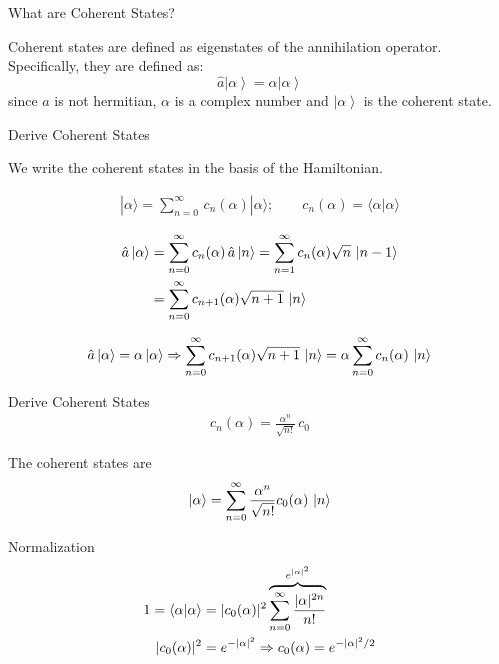 \documentclass{loyola-beamer}
\begin{document}
\begin{frame}{What are Coherent States?}

    Coherent states are defined as eigenstates of the annihilation operator. Specifically, they are defined as:
    \begin{equation}
        \hat{a} \left| \alpha \right\rangle = \alpha \left| \alpha \right\rangle
    \end{equation}
    since $\hat{a}$ is not hermitian, $\alpha$ is a complex number and $\left|\alpha\right\rangle$ is the coherent state.

\end{frame}

\begin{frame}{Derive Coherent States}

    We write the coherent states in the basis of the Hamiltonian.

    \begin{align*}
        | \alpha \rangle  = \sum_{n=0}^{\infty} \, c_n(\alpha) |\alpha \rangle;
        \qquad c_n(\alpha) = \langle \alpha | \alpha \rangle
    \end{align*}

    \begin{align*}
        \hat{a} \ket{\alpha} & = \sum_{n=0}^\infty c_n(\alpha)\, \hat{a} \ket{n}
        = \sum_{n=1}^\infty c_n(\alpha)\sqrt{n}\, \ket{n-1}                            \\
                             & = \sum_{n=0}^\infty c_{n+1}(\alpha)\sqrt{n+1}\, \ket{n}
    \end{align*}

    \begin{align*}
        \hat{a} \ket{\alpha} = \alpha \ket{\alpha} \Rightarrow
        \sum_{n=0}^\infty c_{n+1}(\alpha)\sqrt{n+1}\, \ket{n}
        = \alpha \sum_{n=0}^\infty c_{n}(\alpha)\, \ket{n}
    \end{align*}

\end{frame}

\begin{frame}{Derive Coherent States}
    \begin{align*}
        c_n(\alpha) = \frac{\alpha^n}{\sqrt{n!}}\, c_0
    \end{align*}

    The coherent states are
    \begin{align*}
        \ket{\alpha} = \sum_{n=0}^\infty \frac{\alpha^n}{\sqrt{n!}} c_0(\alpha) \, \ket{n}
    \end{align*}

    Normalization
    \begin{align*}
        1= \bra{\alpha}\ket{\alpha} & = | c_0(\alpha) |^2
        \overbrace{\sum_{n=0}^\infty \frac{|\alpha|^{2n}}{n!}}^{e^{|\alpha|^2}} \\
        | c_0(\alpha) |^2           & = e^{-|\alpha|^2}
        \Rightarrow c_0(\alpha) = e^{-|\alpha|^2/2}
    \end{align*}



\end{frame}
\end{document}

